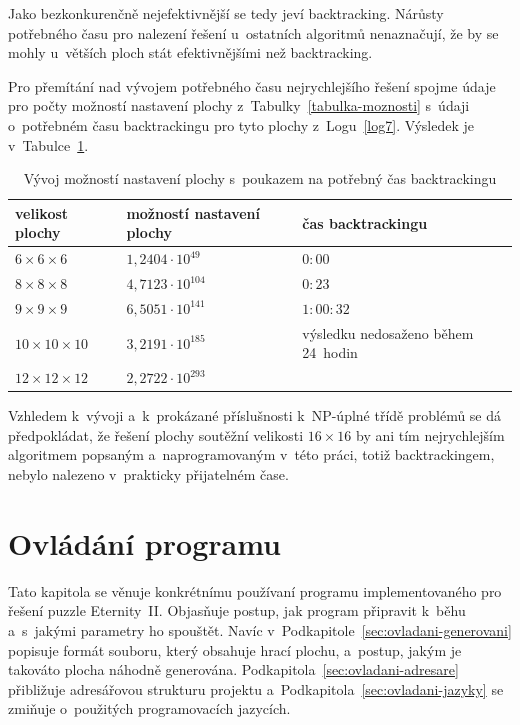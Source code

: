 \documentclass[11pt, titlepage]{report}
\begin{document}
Jako bezkonkurenčně nejefektivnější se tedy jeví backtracking. Nárůsty potřebného času pro nalezení řešení u~ostatních algoritmů nenaznačují, že by se mohly u~větších ploch stát efektivnějšími než backtracking.

Pro přemítání nad vývojem potřebného času nejrychlejšího řešení spojme údaje pro počty možností nastavení plochy z~Tabulky~\ref{tabulka-moznosti} s~údaji o~potřebném času backtrackingu pro tyto plochy z~Logu~\ref{log7}. Výsledek je v~Tabulce~\ref{tabulka-vyvoj}.

\begin{table}[ht]
\centering
\begin{tabular}{|l|l|l|}
\hline
\textbf{velikost plochy} & \textbf{možností nastavení plochy} & \textbf{čas backtrackingu} \\ \hline
$6 \times 6 \times 6$ & $1,240 4 \cdot 10^{49}$ & $0:00$ \\ \hline
$8 \times 8 \times 8$ & $4,712 3 \cdot 10^{104}$ & $0:23$ \\ \hline
$9 \times 9 \times 9$ & $6,505 1 \cdot 10^{141}$ & $1:00:32$ \\ \hline
$10 \times 10 \times 10$ & $3,219 1 \cdot 10^{185}$ & výsledku nedosaženo během 24~hodin \\ \hline
$12 \times 12 \times 12$ & $2,272 2 \cdot 10^{293}$ & \\
\hline
\end{tabular}
\caption{Vývoj možností nastavení plochy s~poukazem na potřebný čas backtrackingu}
\label{tabulka-vyvoj}
\end{table}

Vzhledem k~vývoji a~k~prokázané příslušnosti k~NP-úplné třídě problémů se dá předpokládat, že řešení plochy soutěžní velikosti $16 \times 16$ by ani tím nejrychlejším algoritmem popsaným a~naprogramovaným v~této práci, totiž backtrackingem, nebylo nalezeno v~prakticky přijatelném čase.


\chapter{Ovládání programu}
\label{ch:ovladani}

Tato kapitola se věnuje konkrétnímu používaní programu implementovaného pro řešení puzzle Eternity~II. Objasňuje postup, jak program připravit k~běhu a~s~jakými parametry ho spouštět. Navíc v~Podkapitole~\ref{sec:ovladani-generovani} popisuje formát souboru, který obsahuje hrací plochu, a~postup, jakým je takováto plocha náhodně generována. Podkapitola~\ref{sec:ovladani-adresare} přibližuje adresářovou strukturu projektu a~Podkapitola~\ref{sec:ovladani-jazyky} se zmiňuje o~použitých programovacích jazycích.
\end{document}
